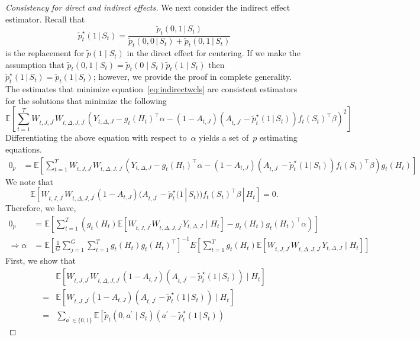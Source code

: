 \documentclass[supplementary, lineno]{biometrika}
\def\E{\mathbb{E}}
\def\given{\, | \,}
\begin{document}
\begin{proof}[Consistency for direct and indirect effects]
We next consider the indirect effect estimator.  Recall that
$$
\tilde{p}^\star_t (1 \given S_t) = \frac{\tilde{p}_t (0,1 \given S_t)}{\tilde{p}_t (0,0 \given S_t)+\tilde{p}_t (0,1 \given S_t)}
$$
is the replacement for $\tilde p(1 \mid S_t)$ in the direct effect for centering.  If we make the assumption that $\tilde p_t (0,1 \mid S_t) = \tilde p_t (0 \mid S_t) \tilde p_t (1 \mid S_t)$ then $\tilde{p}^\star_t (1 \given S_t) = \tilde{p}_t (1 \given S_t)$; however, we provide the proof in complete generality. The estimates that minimize equation~\eqref{eq:indirectwcls} are consistent estimators for the solutions that minimize the following
\[
\E \left[ \sum_{t=1}^T W_{t,J, J^\prime} W_{t,\Delta, J,J^\prime} \left( Y_{t,\Delta,J} - g_t(H_t)^\top \alpha
-  (1-A_{t,J}) (A_{t,J^\prime} - \tilde{p}^\star_t (1 \given S_t) ) f_t (S_t)^\top \beta \right)^2 \right]
\]
Differentiating the above equation with respect to~$\alpha$
yields a set of~$p$ estimating equations.
\begin{align*}
0_{p}&= \E \left[ \sum_{t=1}^T W_{t,J,J^\prime} W_{t,\Delta, J,J^\prime} \left( Y_{t,\Delta,J} - g_t(H_t)^\top \alpha
-  (1-A_{t,J}) (A_{t,J^\prime} - \tilde{p}_t^\star (1 \given S_t) ) f_t (S_t)^\top \beta \right) g_t(H_t) \right]
\end{align*}
We note that
$$
\E \left[ W_{t,J, J^\prime} W_{t,\Delta, J,J^\prime} (1-A_{t,J}) (A_{t,J^\prime} - \tilde{p}_t^\star (1 \given S_t) )
f_t (S_t)^\top \beta \given H_t \right] = 0.
$$
Therefore, we have,
\begin{align*}
0_{p}&= \E \left[ \sum_{t=1}^T (g_t(H_t) \E \left[ W_{t,J,J^\prime} W_{t,\Delta, J,J^\prime} Y_{t,\Delta, J} \mid H_t \right] - g_t(H_t)  g_t(H_t)^\top \alpha) \right] \\
\Rightarrow \alpha  &= \E \left[ \frac{1}{G} \sum_{j=1}^G \sum_{t=1}^T g_t(H_t)  g_t(H_t)^\top  \right]^{-1} E \left[ \sum_{t=1}^T g_t(H_t) \E \left[ W_{t,J, J^\prime} W_{t,\Delta, J,J^\prime} Y_{t,\Delta, J} \mid H_t \right] \right]
\end{align*}
First, we show that
\begin{align*}
&\E \left[ W_{t,J, J^\prime} W_{t,\Delta, J,J^\prime} (1-A_{t,J}) (A_{t,J^\prime} - \tilde{p}_t^\star (1 \given S_t) )
\mid H_t \right] \\
= & \E \left[ W_{t,J, J^\prime} (1-A_{t,J}) (A_{t,J^\prime} - \tilde{p}_t^\star (1 \given S_t) )
\mid H_t \right] \\
= &\sum_{a^\prime \in \{0,1\}} \E \left[ \tilde{p}_t (0,a^\prime \mid S_t)  (a^\prime - \tilde{p}_t^\star (1 \given S_t) )

\end{align*}
\end{proof}
\end{document}

